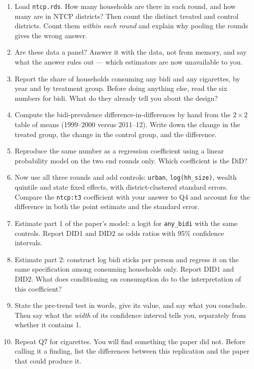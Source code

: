 \documentclass[11pt,a4paper]{article}
\begin{document}
\begin{enumerate}[label=\textbf{Q\arabic*.},leftmargin=*,itemsep=0.7em]

\item Load \texttt{ntcp.rds}. How many households are there in each round, and
how many are in NTCP districts? Then count the distinct treated and control
districts. Count them \emph{within each round} and explain why pooling the
rounds gives the wrong answer.

\item Are these data a panel? Answer it with the data, not from memory, and say
what the answer rules out --- which estimators are now unavailable to you.

\item Report the share of households consuming any bidi and any cigarettes, by
year and by treatment group. Before doing anything else, read the six numbers
for bidi. What do they already tell you about the design?

\item Compute the bidi-prevalence difference-in-differences by hand from the
$2\times2$ table of means (1999--2000 versus 2011--12). Write down the change
in the treated group, the change in the control group, and the difference.

\item Reproduce the same number as a regression coefficient using a linear
probability model on the two end rounds only. Which coefficient is the DiD?

\item Now use all three rounds and add controls: \texttt{urban},
\texttt{log(hh\_size)}, wealth quintile and state fixed effects, with
district-clustered standard errors. Compare the \texttt{ntcp:t3} coefficient
with your answer to Q4 and account for the difference in both the point
estimate and the standard error.

\item Estimate part 1 of the paper's model: a logit for \texttt{any\_bidi} with
the same controls. Report DID1 and DID2 as odds ratios with 95\% confidence
intervals.

\item Estimate part 2: construct log bidi sticks per person and regress it on
the same specification among consuming households only. Report DID1 and DID2.
What does conditioning on consumption do to the interpretation of this
coefficient?

\item State the pre-trend test in words, give its value, and say what you
conclude. Then say what the \emph{width} of its confidence interval tells you,
separately from whether it contains 1.

\item Repeat Q7 for cigarettes. You will find something the paper did not.
Before calling it a finding, list the differences between this replication and
the paper that could produce it.

\end{enumerate}
\end{document}
